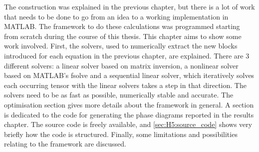 The construction was explained in the previous chapter, but there is a lot of work that needs to be done to go from an idea to a working implementation in MATLAB. The framework to do these calculations was programmed starting from scratch during the course of this thesis. This chapter aims to show some work involved. First, the solvers, used to numerically extract the new blocks introduced for each equation in the previous chapter, are explained. There are 3 different solvers: a linear solver based on matrix inversion, a nonlinear solver based on MATLAB's fsolve and a sequential linear solver, which iteratively solves each occurring tensor with the linear solvers takes a step in that direction. The solvers need to be as fast as possible, numerically stable and accurate. The optimisation section gives more details about the framework in general. A section is dedicated to the code for generating the phase diagrams reported in the results chapter.  The source code is freely available, and \cref{sec:H5:source_code} shows very briefly how the code is structured. Finally, some limitations and possibilities relating to the framework are discussed.